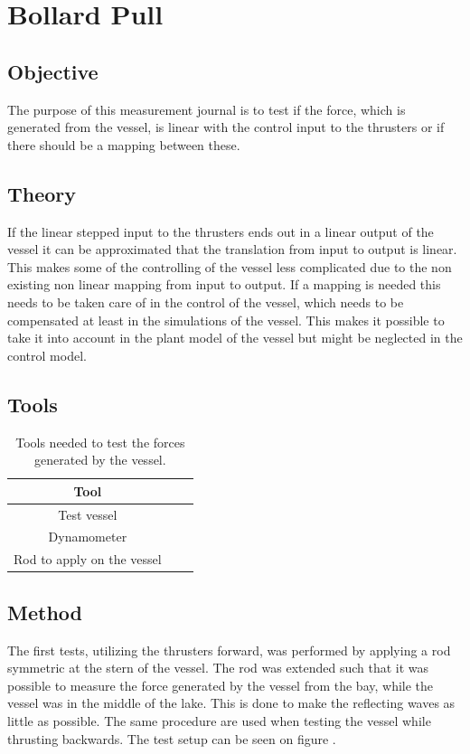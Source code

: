 \chapter{Bollard Pull}
\label{app:bollpull}

\section{Objective}
The purpose of this measurement journal is to test if the force, which is generated from the vessel, is linear with the control input to the thrusters or if there should be a mapping between these.

\section{Theory}
If the linear stepped input to the thrusters ends out in a linear output of the vessel it can be approximated that the translation from input to output is linear. This makes some of the controlling of the vessel less complicated due to the non existing non linear mapping from input to output. If a mapping is needed this needs to be taken care of in the control of the vessel, which needs to be compensated at least in the simulations of the vessel. This makes it possible to take it into account in the plant model of the vessel but might be neglected in the control model.

\section{Tools}
\begin{table}[htbp]
\centering
\begin{tabular}{ccc}
	\toprule
  Tool \\
  \midrule
  Test vessel \\
  Dynamometer \\
  Rod to apply on the vessel \\
  	\bottomrule
\end{tabular}
\caption{Tools needed to test the forces generated by the vessel.}
\label{tab:bollpulltool}
\end{table}

\section{Method}
The first tests, utilizing the thrusters forward, was performed by applying a rod symmetric at the stern of the vessel. The rod was extended such that it was possible to measure the force generated by the vessel from the bay, while the vessel was in the middle of the lake. This is done to make the reflecting waves as little as possible. The same procedure are used when testing the vessel while thrusting backwards. The test setup can be seen on figure .


